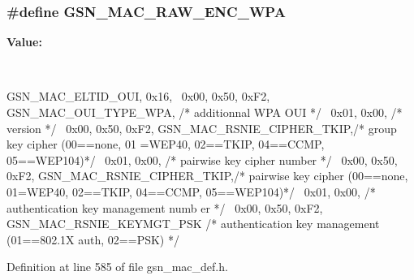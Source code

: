 \hypertarget{a00522_aca1b7df73d2928f30231c28bf61b0d35}{
\subsubsection[{GSN\_\-MAC\_\-RAW\_\-ENC\_\-WPA}]{\setlength{\rightskip}{0pt plus 5cm}\#define GSN\_\-MAC\_\-RAW\_\-ENC\_\-WPA}}
\label{a00522_aca1b7df73d2928f30231c28bf61b0d35}
{\bfseries Value:}
\begin{DoxyCode}
{{                                                                              \
      
    GSN_MAC_ELTID_OUI, 0x16,                                                     
         \
    0x00, 0x50, 0xF2, GSN_MAC_OUI_TYPE_WPA,     /* additionnal WPA OUI           
                                                */ \
    0x01, 0x00,                             /* version                           
                                            */ \
    0x00, 0x50, 0xF2, GSN_MAC_RSNIE_CIPHER_TKIP,/* group key cipher (00==none, 01
      =WEP40, 02==TKIP, 04==CCMP, 05==WEP104)*/    \
    0x01, 0x00,                             /* pairwise key cipher number        
                                            */ \
    0x00, 0x50, 0xF2, GSN_MAC_RSNIE_CIPHER_TKIP,/* pairwise key cipher (00==none,
       01=WEP40, 02==TKIP, 04==CCMP, 05==WEP104)*/ \
    0x01, 0x00,                             /* authentication key management numb
      er                                    */ \
    0x00, 0x50, 0xF2, GSN_MAC_RSNIE_KEYMGT_PSK  /* authentication key management 
      (01==802.1X auth, 02==PSK)                */ \
}}
\end{DoxyCode}


Definition at line 585 of file gsn\_\-mac\_\-def.h.

